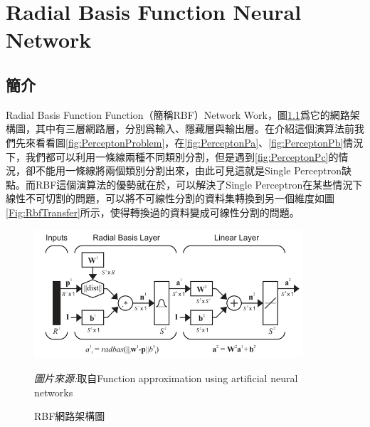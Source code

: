 \chapter{Radial Basis Function Neural Network}
\label{chapter:rbf}
\section{簡介}
Radial Basis Function Function（簡稱RBF）Network Work，圖\ref{fig:RbfNetwork}爲它的網路架構圖，其中有三層網路層，分別爲輸入、隱藏層與輸出層。在介紹這個演算法前我們先來看看圖\ref{fig:PerceptonProblem}，在\ref{fig:PerceptonPa}、\ref{fig:PerceptonPb}情況下，我們都可以利用一條線兩種不同類別分割，但是遇到\ref{fig:PerceptonPc}的情況，卻不能用一條線將兩個類別分割出來，由此可見這就是Single Perceptron缺點。而RBF這個演算法的優勢就在於，可以解決了Single Perceptron在某些情況下線性不可切割的問題，可以將不可線性分割的資料集轉換到另一個維度如圖\ref{Fig:RbfTransfer}所示，使得轉換過的資料變成可線性分割的問題。
\begin{figure}[htbp]
	\centering
	\centerline{\includegraphics[width=10cm]{pic/rbf_architecture.jpg}}
	\caption{RBF網路架構圖}
	\begin{minipage}{.7\linewidth}
		\footnotesize
		\emph{圖片來源:}取自Function approximation using artificial neural networks
	\end{minipage}
	\label{fig:RbfNetwork}
\end{figure}

